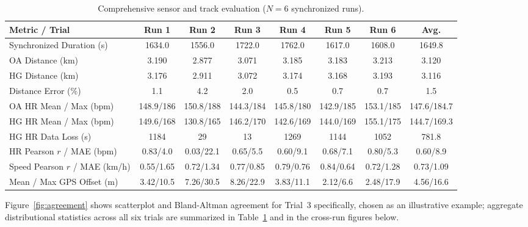 \documentclass{acmsiggraph}
\begin{document}
\begin{table}[t]
\centering
\caption{Comprehensive sensor and track evaluation ($N=6$ synchronized runs).}
\label{tab:results}
\small
\begin{tabular}{lccccccc}
\toprule
Metric / Trial & Run 1 & Run 2 & Run 3 & Run 4 & Run 5 & Run 6 & Avg. \\
\midrule
Synchronized Duration (s) & 1634.0 & 1556.0 & 1722.0 & 1762.0 & 1617.0 & 1608.0 & 1649.8 \\
OA Distance (km)          & 3.190  & 2.877  & 3.071  & 3.185  & 3.183  & 3.213  & 3.120 \\
HG Distance (km)          & 3.176  & 2.911  & 3.072  & 3.174  & 3.168  & 3.193  & 3.116 \\
Distance Error (\%)       & 1.1    & 4.2    & 2.0    & 0.5    & 0.7    & 0.7    & 1.5 \\
\midrule
OA HR Mean / Max (bpm)    & 148.9/186 & 150.8/188 & 144.3/184 & 145.8/180 & 142.9/185 & 153.1/185 & 147.6/184.7 \\
HG HR Mean / Max (bpm)    & 149.6/168 & 130.8/165 & 146.2/170 & 142.6/169 & 144.0/169 & 155.1/175 & 144.7/169.3 \\
HG HR Data Loss (s)       & 1184   & 29     & 13     & 1269   & 1144   & 1052   & 781.8 \\
HR Pearson $r$ / MAE (bpm) & 0.83/4.0 & 0.03/22.1 & 0.65/5.5 & 0.60/9.1 & 0.68/7.1 & 0.80/5.3 & 0.60/8.9 \\
Speed Pearson $r$ / MAE (km/h) & 0.55/1.65 & 0.72/1.34 & 0.77/0.85 & 0.79/0.76 & 0.84/0.64 & 0.72/1.28 & 0.73/1.09 \\
\midrule
Mean / Max GPS Offset (m) & 3.42/10.5 & 7.26/30.5 & 8.26/22.9 & 3.83/11.1 & 2.12/6.6 & 2.48/17.9 & 4.56/16.6 \\
\bottomrule
\end{tabular}
\end{table}

Figure~\ref{fig:agreement} shows scatterplot and Bland-Altman agreement
for Trial~3 specifically, chosen as an illustrative example; aggregate
distributional statistics across all six trials are summarized in
Table~\ref{tab:results} and in the cross-run figures below.
\end{document}
